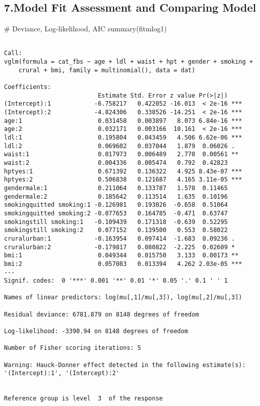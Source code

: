 \documentclass[
  letterpaper,
  DIV=11,
  numbers=noendperiod]{scrartcl}
\newenvironment{Shaded}{\begin{snugshade}}{\end{snugshade}}
\newcommand{\CommentTok}[1]{\textcolor[rgb]{0.37,0.37,0.37}{#1}}
\newcommand{\FunctionTok}[1]{\textcolor[rgb]{0.28,0.35,0.67}{#1}}
\newcommand{\NormalTok}[1]{\textcolor[rgb]{0.00,0.23,0.31}{#1}}
\begin{document}
\subsection{7.Model Fit Assessment and Comparing
Model}\label{model-fit-assessment-and-comparing-model}

\begin{Shaded}
\begin{Highlighting}[]
\CommentTok{\# Deviance, Log{-}likelihood, AIC}
\FunctionTok{summary}\NormalTok{(fitmlog1)}
\end{Highlighting}
\end{Shaded}

\begin{verbatim}

Call:
vglm(formula = cat_fbs ~ age + ldl + waist + hpt + gender + smoking + 
    crural + bmi, family = multinomial(), data = dat)

Coefficients: 
                          Estimate Std. Error z value Pr(>|z|)    
(Intercept):1            -6.758217   0.422052 -16.013  < 2e-16 ***
(Intercept):2            -4.824306   0.338526 -14.251  < 2e-16 ***
age:1                     0.031458   0.003897   8.073 6.84e-16 ***
age:2                     0.032171   0.003166  10.161  < 2e-16 ***
ldl:1                     0.195804   0.043459   4.506 6.62e-06 ***
ldl:2                     0.069602   0.037044   1.879  0.06026 .  
waist:1                   0.017973   0.006489   2.770  0.00561 ** 
waist:2                   0.004336   0.005474   0.792  0.42823    
hptyes:1                  0.671392   0.136322   4.925 8.43e-07 ***
hptyes:2                  0.506838   0.121687   4.165 3.11e-05 ***
gendermale:1              0.211064   0.133787   1.578  0.11465    
gendermale:2              0.185642   0.113514   1.635  0.10196    
smokingquitted smoking:1 -0.126981   0.193026  -0.658  0.51064    
smokingquitted smoking:2 -0.077653   0.164785  -0.471  0.63747    
smokingstill smoking:1   -0.109439   0.171318  -0.639  0.52295    
smokingstill smoking:2    0.077152   0.139500   0.553  0.58022    
cruralurban:1            -0.163954   0.097414  -1.683  0.09236 .  
cruralurban:2            -0.179817   0.080822  -2.225  0.02609 *  
bmi:1                     0.049344   0.015750   3.133  0.00173 ** 
bmi:2                     0.057083   0.013394   4.262 2.03e-05 ***
---
Signif. codes:  0 '***' 0.001 '**' 0.01 '*' 0.05 '.' 0.1 ' ' 1

Names of linear predictors: log(mu[,1]/mu[,3]), log(mu[,2]/mu[,3])

Residual deviance: 6781.879 on 8148 degrees of freedom

Log-likelihood: -3390.94 on 8148 degrees of freedom

Number of Fisher scoring iterations: 5 

Warning: Hauck-Donner effect detected in the following estimate(s):
'(Intercept):1', '(Intercept):2'


Reference group is level  3  of the response
\end{verbatim}
\end{document}

